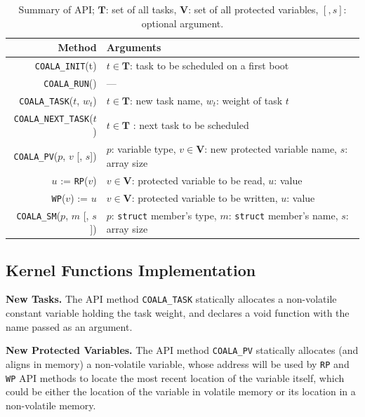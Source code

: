 \begin{table}
\centering
\begin{tabular}{| r | p{} |}
	\hline
	{Method} & {Arguments} \\
	\hline\hline
	\texttt{COALA\_INIT}(t) & $t \in \mathbf{T}$: task to be scheduled on a first boot \\
	\hline
	\texttt{COALA\_RUN}() & --- \\
	\hline
	\texttt{COALA\_TASK}($t$, $w_t$) & $t \in \mathbf{T}$: new task name, $w_t$: weight of task $t$ \\
	\hline
	\texttt{COALA\_NEXT\_TASK}($t$) & $t \in \mathbf{T}$ : next task to be scheduled\\
	\hline
	\texttt{COALA\_PV}($p$, $v$ [, $s$]) & $p$: variable type, $v \in \mathbf{V}$: new protected variable name, $s$: array size\\
	\hline
	$u$ := \texttt{RP}($v$) & $v \in \mathbf{V}$: protected variable to be read, $u$: value \\
	\hline	
	\texttt{WP}($v$) := $u$ &  $v \in \mathbf{V}$: protected variable to be written, $u$: value \\
	\hline
	\texttt{COALA\_SM}($p$, $m$ [, $s$]) & $p$: \texttt{struct} member's type, $m$: \texttt{struct} member's name, $s$: array size \\
	\hline
\end{tabular}
\caption{Summary of \sys API; $\mathbf{T}$: set of all tasks, $\mathbf{V}$: set of all protected variables, $[, s]$: optional argument.}
\label{table:coala_api}
\end{table}

\subsection{\sys Kernel Functions Implementation}

\textbf{New Tasks.} The API method \texttt{COALA\_TASK} statically allocates a non-volatile constant variable holding the task weight, and declares a void function with the name passed as an argument.

\noindent \textbf{New Protected Variables.} The API method \texttt{COALA\_PV} statically allocates (and aligns in memory) a non-volatile variable, whose address will be used by \texttt{RP} and \texttt{WP} API methods to locate the most recent location of the variable itself, which could be either the location of the variable in volatile memory or its location in a non-volatile memory.

